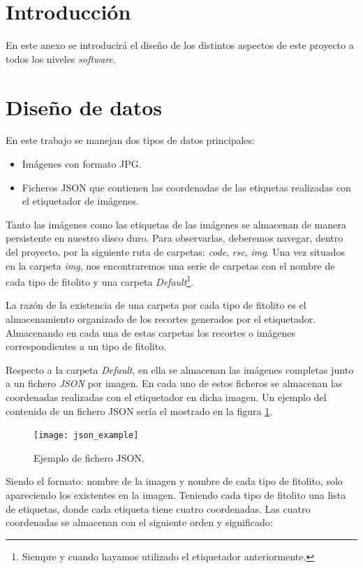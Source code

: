 
\section{Introducción}

En este anexo se introducirá el diseño de los distintos aspectos de este proyecto a todos los niveles \textit{software}.

\section{Diseño de datos}

En este trabajo se manejan dos tipos de datos principales:

\begin{itemize}
	\item Imágenes con formato JPG.
	\item Ficheros JSON que contienen las coordenadas de las etiquetas realizadas con el etiquetador de imágenes.
\end{itemize}

Tanto las imágenes como las etiquetas de las imágenes se almacenan de manera persistente en nuestro disco duro. Para observarlas, deberemos navegar, dentro del proyecto, por la siguiente ruta de carpetas: \textit{code}, \textit{rsc}, \textit{img}. Una vez situados en la carpeta \textit{img}, nos encontraremos una serie de carpetas con el nombre de cada tipo de fitolito y una carpeta \textit{Default}\footnote{Siempre y cuando hayamos utilizado el etiquetador anteriormente.}.

La razón de la existencia de una carpeta por cada tipo de fitolito es el almacenamiento organizado de los recortes generados por el etiquetador. Almacenando en cada una de estas carpetas los recortes o imágenes correspondientes a un tipo de fitolito. 

Respecto a la carpeta \textit{Default}, en ella se almacenan las imágenes completas junto a un fichero \textit{JSON} por imagen. En cada uno de estos ficheros se almacenan las coordenadas  realizadas con el etiquetador en dicha imagen. Un ejemplo del contenido de un fichero JSON sería el mostrado en la figura \ref{fig:C.1.1}.

\begin{figure}
\centering
\texttt{[image: json\_example]}
\caption{Ejemplo de fichero JSON.}
\label{fig:C.1.1}
\end{figure}

Siendo el formato: nombre de la imagen y nombre de cada tipo de fitolito, solo apareciendo los existentes en la imagen. Teniendo cada tipo de fitolito una lista de etiquetas, donde cada etiqueta tiene cuatro coordenadas. Las cuatro coordenadas se almacenan con el siguiente orden y significado:

